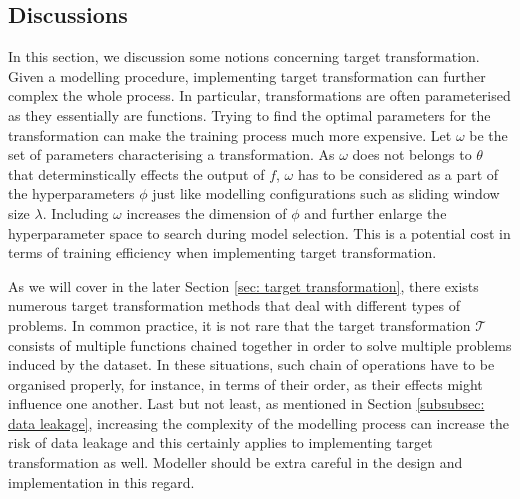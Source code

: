 \subsection{Discussions}
In this section, we discussion some notions concerning target transformation. Given a modelling procedure, implementing target transformation can further complex the whole process. In particular, transformations are often parameterised as they essentially are functions. Trying to find the optimal parameters for the transformation can make the training process much more expensive. Let $\omega$ be the set of parameters characterising a transformation. As $\omega$ does not belongs to $\theta$ that determinstically effects the output of $f$, $\omega$ has to be considered as a part of the hyperparameters $\phi$ just like modelling configurations such as sliding window size $\lambda$. Including $\omega$ increases the dimension of $\phi$ and further enlarge the hyperparameter space to search during model selection. This is a potential cost in terms of training efficiency when implementing target transformation.

As we will cover in the later Section \ref{sec: target transformation}, there exists numerous target transformation methods that deal with different types of problems. In common practice, it is not rare that the target transformation $\mathcal{T}$ consists of multiple functions chained together in order to solve multiple problems induced by the dataset. In these situations, such chain of operations have to be organised properly, for instance, in terms of their order, as their effects might influence one another. Last but not least, as mentioned in Section \ref{subsubsec: data leakage}, increasing the complexity of the modelling process can increase the risk of data leakage and this certainly applies to implementing target transformation as well. Modeller should be extra careful in the design and implementation in this regard.
